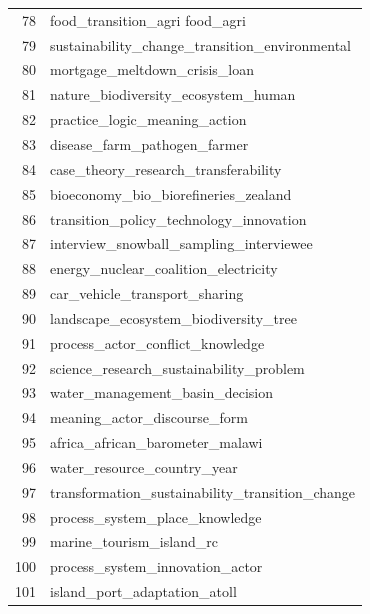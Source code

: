 \documentclass[12pt]{article}
\begin{document}
\begin{landscape}
\begin{figure}[htbp]
\begin{minipage}{0.15\textwidth}
\begin{tabular}{rl}
           78 &                     food\_transition\_agri food\_agri \\
           79 &     sustainability\_change\_transition\_environmental \\
           80 &                      mortgage\_meltdown\_crisis\_loan \\
           81 &                nature\_biodiversity\_ecosystem\_human \\
           82 &                      practice\_logic\_meaning\_action \\
           83 &                       disease\_farm\_pathogen\_farmer \\
           84 &               case\_theory\_research\_transferability \\
           85 &               bioeconomy\_bio\_biorefineries\_zealand \\
           86 &            transition\_policy\_technology\_innovation \\
           87 &            interview\_snowball\_sampling\_interviewee \\
           88 &               energy\_nuclear\_coalition\_electricity \\
           89 &                      car\_vehicle\_transport\_sharing \\
           90 &              landscape\_ecosystem\_biodiversity\_tree \\
           91 &                   process\_actor\_conflict\_knowledge \\
           92 &            science\_research\_sustainability\_problem \\
           93 &                    water\_management\_basin\_decision \\
           94 &                       meaning\_actor\_discourse\_form \\
           95 &                    africa\_african\_barometer\_malawi \\
           96 &                        water\_resource\_country\_year \\
           97 &    transformation\_sustainability\_transition\_change \\
           98 &                     process\_system\_place\_knowledge \\
           99 &                           marine\_tourism\_island\_rc \\
          100 &                    process\_system\_innovation\_actor \\
          101 &                       island\_port\_adaptation\_atoll \\

\end{tabular}
\end{minipage}
\end{figure}
\end{landscape}
\end{document}

